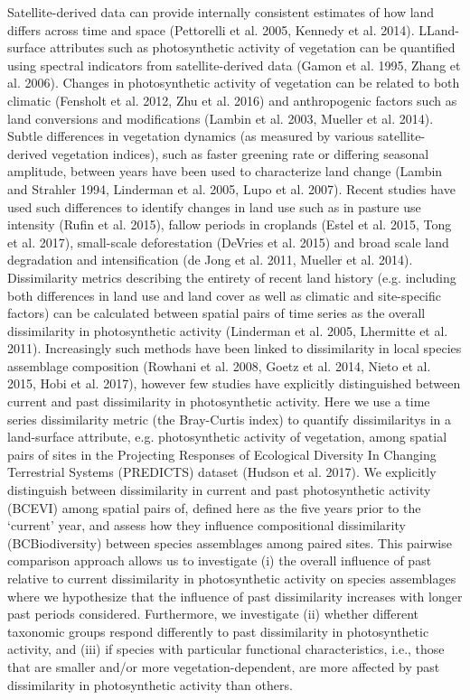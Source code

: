 	Satellite-derived data can provide internally consistent estimates of how land differs across time and space (Pettorelli et al. 2005, Kennedy et al. 2014). LLand-surface attributes such as photosynthetic activity of vegetation can be quantified using spectral indicators from satellite-derived data (Gamon et al. 1995, Zhang et al. 2006). Changes in photosynthetic activity of vegetation can be related to both climatic (Fensholt et al. 2012, Zhu et al. 2016) and anthropogenic factors such as land conversions and modifications (Lambin et al. 2003, Mueller et al. 2014). Subtle differences in vegetation dynamics (as measured by various satellite-derived vegetation indices), such as faster greening rate or differing seasonal amplitude, between years have been used to characterize land change (Lambin and Strahler 1994, Linderman et al. 2005, Lupo et al. 2007). Recent studies have used such differences to identify changes in land use such as in pasture use intensity (Rufin et al. 2015), fallow periods in croplands (Estel et al. 2015, Tong et al. 2017), small-scale deforestation (DeVries et al. 2015) and broad scale land degradation and intensification (de Jong et al. 2011, Mueller et al. 2014).  Dissimilarity metrics describing the entirety of recent land history (e.g. including both differences in land use and land cover as well as climatic and site-specific factors) can be calculated between spatial pairs of time series as the overall dissimilarity in photosynthetic activity (Linderman et al. 2005, Lhermitte et al. 2011). Increasingly such methods have been linked to dissimilarity in local species assemblage composition (Rowhani et al. 2008, Goetz et al. 2014, Nieto et al. 2015, Hobi et al. 2017), however few studies have explicitly distinguished between current and past dissimilarity in photosynthetic activity.
	Here we use a time series dissimilarity metric (the Bray-Curtis index) to quantify dissimilaritys in a land-surface attribute, e.g. photosynthetic activity of vegetation, among spatial pairs of sites in the Projecting Responses of Ecological Diversity In Changing Terrestrial Systems (PREDICTS) dataset (Hudson et al. 2017). We explicitly distinguish between dissimilarity in current and past photosynthetic activity (BCEVI­) among spatial pairs of, defined here as the five years prior to the ‘current’ year, and assess how they influence compositional dissimilarity (BCBiodiversity­) between species assemblages among paired sites. This pairwise comparison approach allows us to investigate (i) the overall influence of past relative to current dissimilarity in photosynthetic activity on species assemblages where we hypothesize that the influence of past dissimilarity increases with longer past periods considered. Furthermore, we investigate (ii) whether different taxonomic groups respond differently to past dissimilarity in photosynthetic activity, and (iii) if species with particular functional characteristics, i.e., those that are smaller and/or more vegetation-dependent, are more affected by past dissimilarity in photosynthetic activity than others. 

